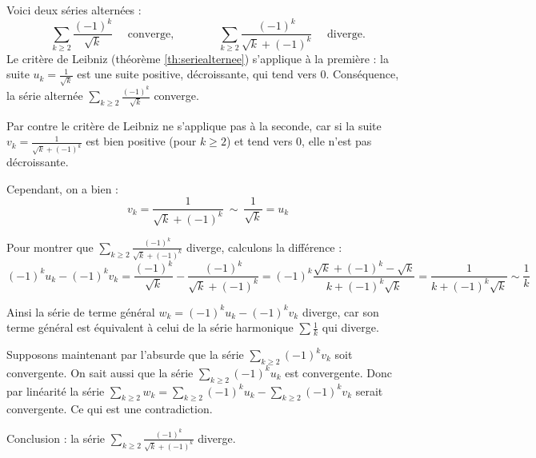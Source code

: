 \documentclass[class=report,crop=false]{standalone}
\begin{document}
\begin{exemple}
Voici deux séries alternées :
$$
\sum_{k \ge 2}  \frac{(-1)^k}{\sqrt{k}}
\quad \text{ converge,}
\qquad\qquad
\sum_{k \ge 2}  \frac{(-1)^k}{\sqrt{k}+(-1)^k}
\quad \text{ diverge.}
$$ 
Le critère de Leibniz (théorème \ref{th:seriealternee}) s'applique à la première :
la suite $u_k = \frac{1}{\sqrt k}$ est une suite positive, décroissante, 
qui tend vers $0$. Conséquence, la série alternée  
$\sum_{k \ge 2}  \frac{(-1)^k}{\sqrt{k}}$ converge.


Par contre le critère de Leibniz ne s'applique pas à la seconde, 
car si la suite $v_k = \frac{1}{\sqrt{k}+(-1)^k}$ est bien
positive (pour $k \ge 2$) et tend vers $0$, elle n'est pas
décroissante. 

Cependant, on a bien :
$$
v_k = \frac{1}{\sqrt{k}+(-1)^k} \ \sim \ \frac{1}{\sqrt{k}} = u_k
$$


Pour montrer que $\sum_{k \ge 2} \frac{(-1)^k}{\sqrt{k}+(-1)^k}$ diverge,
calculons la différence : 
$$
(-1)^ku_k-(-1)^kv_k 
=  \frac{(-1)^k}{\sqrt{k}}-\frac{(-1)^k}{\sqrt{k}+(-1)^k} 
= (-1)^k\frac{\sqrt{k}+(-1)^k-\sqrt{k}}{k+(-1)^k\sqrt{k}} 
=  \frac{1}{k+(-1)^k\sqrt{k}} 
\sim  \frac{1}{k} 
$$


Ainsi la série de terme général $w_k = (-1)^ku_k-(-1)^kv_k$
diverge, car son terme général est équivalent 
à celui de la série harmonique $\sum \frac{1}{k}$
qui diverge.

Supposons maintenant par l'absurde que la série
$\sum_{k \ge 2}(-1)^k v_k$ soit convergente.
On sait aussi que la série $\sum_{k \ge 2} (-1)^k u_k$
est convergente. Donc par linéarité la série
$\sum_{k \ge 2} w_k = \sum_{k \ge 2} (-1)^k u_k - \sum_{k \ge 2} (-1)^k v_k$
serait convergente. Ce qui est une contradiction.


Conclusion : la série $\sum_{k \ge 2} \frac{(-1)^k}{\sqrt{k}+(-1)^k}$ diverge.  
\end{exemple}

\end{document}
